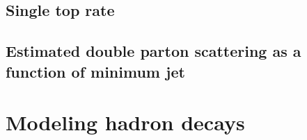 \documentclass[12pt]{ucbthesis}
\begin{document}
\section{Single top rate}
\label{app:unfoldwt}


\section{Estimated double parton scattering as a function of minimum jet \pt}
\label{app:dps}

\chapter{Modeling hadron decays}
\label{app:evtgen}

\backmatter


\end{document}
